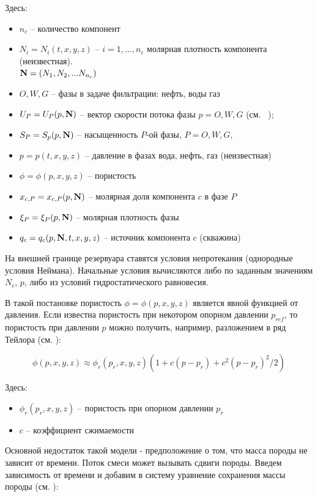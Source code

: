 \documentclass[11pt,twoside]{article}
\begin{document}
{\small
Здесь:
\begin{itemize}
\setlength\itemsep{0 em}
\item $n_c$ -- количество компонент \label{model_types}
\item $N_i=N_i(t,x,y,z)$  -- $i=1,\ldots, n_c$
молярная плотность компонента (неизвестная).\\ ${\bf N} = (N_1, N_2, ... N_{n_c})$
\item $O,W,G$ -- фазы в задаче фильтрации: нефть, воды газ
\item $U_P = U_P(p,{\bf N})$ -- вектор скорости потока фазы $p=O,W,G$ (см. ~\cite{Chen});
\item $S_P=S_p(p, {\bf N})$ -- насыщенность $P$-ой фазы, $P=O,W,G$,
\item $p=p(t,x,y,z)$  -- давление в фазах вода, нефть, газ (неизвестная)
\item $\phi=\phi(p,x,y,z)$ -- пористость
\item $x_{c,P} = x_{c,P}(p, \bf N)$ -- молярная доля компонента  $c$ в фазе $P$
\item $\xi_P = \xi_P(p, \bf N)$ -- молярная плотность фазы
\item $q_c = q_c (p, {\bf N}, t, x, y, z)$ -- источник компонента $c$ (скважина)
\end{itemize}
}
На внешней границе резервуара ставятся условия 
непротекания (однородные условия Неймана).
Начальные условия вычисляются либо по заданным значениям $N_c$, $p$, либо из условий гидростатического равновесия.

В такой постановке пористость $\phi=\phi(p,x,y,z)$ является явной функцией от давления. Если известна пористость при некотором опорном давлении $p_{ref}$, то пористость при давлении $p$ можно получить, например, разложением в ряд Тейлора (см. \cite{Chen}):

\begin{equation}
\label{porosity_ecl}
  \phi(p,x,y,z) \approx \phi_{r}(p_{r}, x,y,z)(1 + c (p - p_{r}) + c^2 (p - p_{r})^2/2)
\end{equation}
{\small
Здесь:
\begin{itemize}
\setlength\itemsep{0 em}
\item   $\phi_{r}(p_r, x,y,z)$ -- пористость при опорном давлении $p_{r}$
\item   $c$ -- коэффициент сжимаемости
\end{itemize}}

Основной недостаток такой модели - предположение о том, что масса породы не зависит от времени. Поток смеси может вызывать сдвиги породы. Введем зависимость от времени и добавим в систему уравнение сохранения массы породы (см. \cite{Aziz}):
\end{document}
